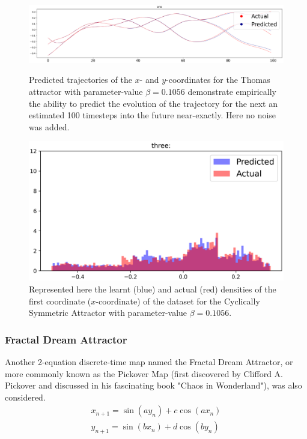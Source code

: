 \documentclass[a4paper,12pt,twoside]{report}
\begin{document}
\begin{figure}[ht]
  \centering
  \includegraphics[scale=0.35]{_Thomas_1.eps}\caption*{Predicted trajectories of the $x$- and $y$-coordinates for the Thomas attractor with parameter-value $\beta=0.1056$ demonstrate empirically the ability to predict the evolution of the trajectory for the next an estimated 100 timesteps into the future near-exactly. Here no noise was added.}
  \includegraphics[scale=0.5]{_Thomas_3.eps}\caption*{Represented here the learnt (blue) and actual (red) densities of the first coordinate ($x$-coordinate) of the dataset for the Cyclically Symmetric Attractor with parameter-value $\beta=0.1056$.}
\end{figure}


\subsubsection{Fractal Dream Attractor}

Another 2-equation discrete-time map named the Fractal Dream Attractor, or more commonly known as the Pickover Map (first discovered by Clifford A. Pickover and discussed in his fascinating book "Chaos in Wonderland"\cite{PickoverChaos}), was also considered.
\begin{eqnarray}\label{eqns_clifford}
  {x_{n+1}=\sin(ay_n) + c\cos(ax_n)} \\
  {y_{n+1}=\sin(bx_n)+d\cos(by_n)}
\end{eqnarray}
\end{document}
